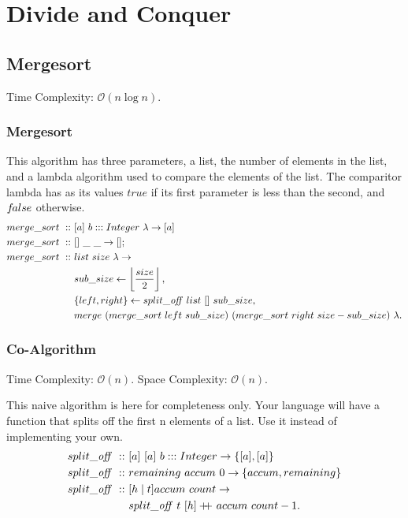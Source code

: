 \documentclass[a4paper,10pt]{book}
\newcommand\doubleplus{+\kern-1.3ex+\kern0.8ex}
\newcommand{\false}{f\kern-0.25ex{alse}}
\begin{document}
\chapter{Divide and Conquer}
\section{Mergesort}Time Complexity: $\mathcal{O}(n\log n)$.

\subsection{Mergesort}
This algorithm has three parameters, a list, the number of elements in the list, and a lambda algorithm used to compare the elements of the list. The comparitor lambda has as its values $true$ if its first parameter is less than the second, and $\false$ otherwise.
\begin{align*}
merge\_sort\ ::\ &[a]\ b:::Integer\ \lambda\rightarrow [a]\\
merge\_sort\ ::\ &[]\ \_\ \_\rightarrow [];\\
merge\_sort\ ::\ &list\ size\ \lambda\rightarrow\\
	&sub\_size\leftarrow \left\lfloor\frac{size}{2}\right\rfloor,\\
	&\{left,right\}\leftarrow split\_\text{\textit{off}}\ list\ []\ sub\_size,\\
	&merge\ (merge\_sort\ left\ sub\_size)\ (merge\_sort\ right\ size-sub\_size)\ \lambda.
\end{align*}

\subsection{Co-Algorithm}\label{split_off} Time Complexity: $\mathcal{O}(n)$. Space Complexity: $\mathcal{O}(n)$.

This naive algorithm is here for completeness only. Your language will have a function that splits off the first n elements of a list. Use it instead of implementing your own.
\begin{align*}
split\_\text{\textit{off}}\ ::\ &[a]\ [a]\ b:::Integer\rightarrow \{[a],[a]\}\\
split\_\text{\textit{off}}\ ::\ &remaining\ accum\ 0\rightarrow \{accum,remaining\}\\
split\_\text{\textit{off}}\ ::\ &[h\mid t]accum\ count\rightarrow\\
	&split\_\text{\textit{off}}\ t\ [h]\doubleplus accum\ count-1.
\end{align*}
\end{document}
